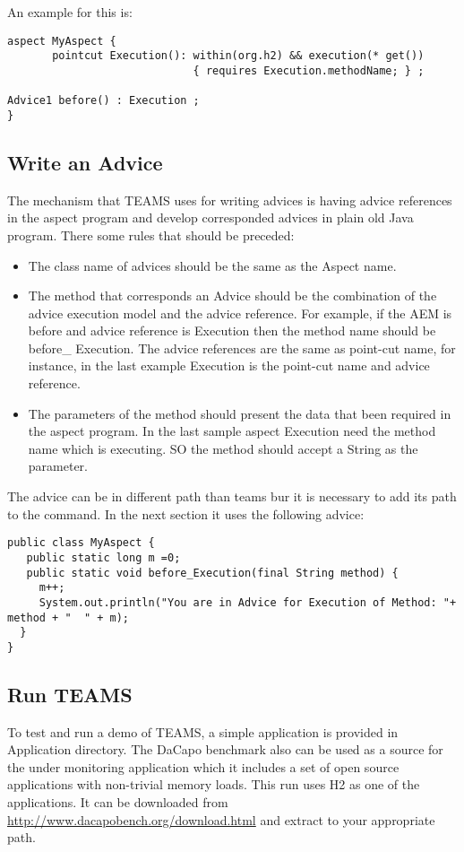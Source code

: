 \documentclass{report}
\begin{document}
An example for this is:
\begin{verbatim}
aspect MyAspect {
       pointcut Execution(): within(org.h2) && execution(* get())
                             { requires Execution.methodName; } ;

Advice1 before() : Execution ;
}
\end{verbatim}
\subsection{Write an Advice}
The mechanism that T{\small EAMS} uses for writing advices is having advice references in the aspect program and develop corresponded advices in plain old Java program. There some rules that should be preceded:
\begin{itemize}
\item The class name of advices should be the same as the Aspect name.
\item The method that corresponds an Advice should be the combination of the advice execution model and the advice reference. For example, if the AEM is before and advice reference is Execution then the method name should be before\_ Execution. The advice references are the same as point-cut name, for instance, in the last example Execution is the point-cut name and advice reference. 
\item The parameters of the method should present the data that been required in the aspect program. In the last sample aspect Execution need the method name which is executing. SO the method should accept a String as the parameter.
\end{itemize}

The advice can be in different path than teams bur it is necessary to add its path to the command. In the next section it uses the following advice:
\begin{verbatim}
public class MyAspect {
   public static long m =0;
   public static void before_Execution(final String method) {
     m++;
     System.out.println("You are in Advice for Execution of Method: "+ method + "  " + m);
  }
}
\end{verbatim}

\subsection{Run T{\small EAMS}}
To test and run a demo of T{\small EAMS}, a simple application is provided in Application directory. The DaCapo benchmark also can be used as a source for the under monitoring application which it includes a set of open source applications with non-trivial memory loads. This run uses H2 as one of the applications. It can be downloaded from \url{http://www.dacapobench.org/download.html} and extract to your appropriate path.\\ 
\end{document}
